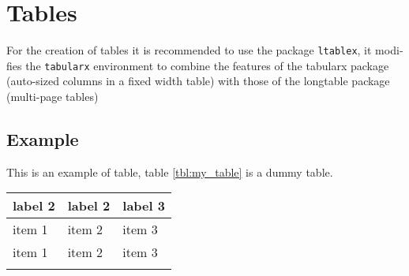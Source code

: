 \section{Tables}
For the creation of tables it is recommended to use the pack­age \texttt{ltablex}, it mod­i­fies the \texttt{tab­u­larx} en­vi­ron­ment to com­bine the fea­tures of the tab­u­larx pack­age (auto-sized columns in a fixed width ta­ble) with those of the longtable pack­age (multi-page ta­bles)

\subsection{Example}
This is an example of table, table \ref{tbl:my_table} is a dummy table.

\begin{tabularx}{\textwidth}{|X|X|X|} \hline
\textbf{label 2} & \textbf{label 2} & \textbf{label 3} \\ \hline
item 1           & item 2           & item 3           \\ \hline  
item 1           & item 2           & item 3           \\ \hline 
\caption{My table}\label{tbl:my_table} 
\end{tabularx}
